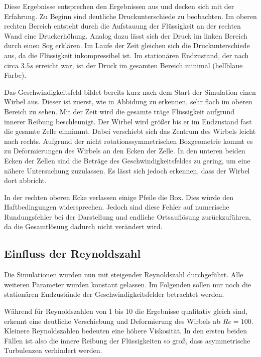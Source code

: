 		Diese Ergebnisse entsprechen den Ergebnissen aus \cite{nsfd} und decken sich mit der Erfahrung.
		Zu Beginn sind deutliche Druckunterschiede zu beobachten.
		Im oberen rechten Bereich entsteht durch die Aufstauung der Flüssigkeit an der rechten Wand eine Druckerhöhung.
		Analog dazu lässt sich der Druck im linken Bereich durch einen Sog erklären.
		Im Laufe der Zeit gleichen sich die Druckunterschiede aus, da die Flüssigkeit inkompressibel ist.
		Im stationären Endzustand, der nach circa $3.5\unit{s}$ erreicht war, ist der Druck im gesamten Bereich minimal (hellblaue Farbe).

		Das Geschwindigkeitsfeld bildet bereits kurz nach dem Start der Simulation einen Wirbel aus.
		Dieser ist zuerst, wie in Abbidung zu erkennen, sehr flach im oberen Bereich zu sehen.
		Mit der Zeit wird die gesamte träge Flüssigkeit aufgrund innerer Reibung beschleunigt.
		Der Wirbel wird größer bis er im Endzustand fast die gesamte Zelle einnimmt.
		Dabei verschiebt sich das Zentrum des Wirbels leicht nach rechts.
		Aufgrund der nicht rotationssymmetrischen Boxgeometrie kommt es zu Deformierungen des Wirbels an den Ecken der Zelle.
		In den unteren beiden Ecken der Zellen sind die Beträge des Geschwindigkeitsfeldes zu gering, um eine nähere Untersuchung zuzulassen.
		Es lässt sich jedoch erkennen, dass der Wirbel dort abbricht.

		In der rechten oberen Ecke verlassen einige Pfeile die Box.
		Dies würde den Haftbedingungen widersprechen.
		Jedoch sind diese Fehler auf numerische Rundungsfehler bei der Darstellung und endliche Ortsauflösung zurückzuführen, da die Gesamtlösung dadurch nicht verändert wird.



	\subsection{Einfluss der Reynoldszahl} %
	\label{sub:einfluss_der_reynoldszahl}

		Die Simulationen wurden nun mit steigender Reynoldszahl durchgeführt.
		Alle weiteren Parameter wurden konstant gelassen.
		Im Folgenden sollen nur noch die stationären Endzustände der Geschwindigkeitsfelder betrachtet werden.

		Während für Reynoldszahlen von $1$ bis $10$ die Ergebnisse qualitativ gleich sind, erkennt eine deutliche Verschiebung und Deformierung des Wirbels ab $Re = 100$.
		Kleinere Reynoldszahlen bedeuten eine höhere Viskosität.
		In den ersten beiden Fällen ist also die innere Reibung der Flüssigkeiten so groß, dass asymmetrische Turbulenzen verhindert werden.

